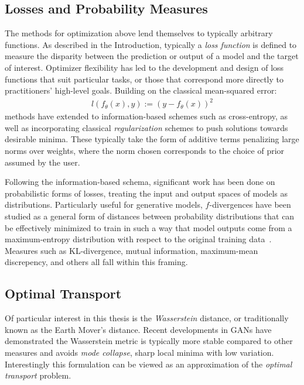 \subsection{Losses and Probability Measures}
The methods for optimization above
lend themselves to typically arbitrary functions.
As described in the Introduction,
typically a \textit{loss function}
is defined to measure the disparity
between the prediction or output of a model
and the target of interest.
Optimizer flexibility has led
to the development and design of loss functions
that suit particular tasks,
or those that correspond more directly
to practitioners' high-level goals.
Building on the classical mean-squared error:
\begin{align}
l(f_\theta(x), y) := (y - f_\theta(x))^2
\end{align}
methods have extended to information-based schemes
such as cross-entropy, as well as 
incorporating classical \textit{regularization} schemes
to push solutions towards desirable minima.
These typically take the form of additive terms 
penalizing large norms over weights, where
the norm chosen corresponds to the choice of 
prior assumed by the user.

Following the information-based schema,
significant work has been done
on probabilistic forms of losses,
treating the input and output spaces
of models as distributions.
Particularly useful for generative models,
$f$-divergences have been studied
as a general form of distances
between probability distributions
that can be effectively minimized to
train in such a way that model outputs
come from a maximum-entropy distribution
with respect to the original training data~\citep{fgan}.
Measures such as KL-divergence, mutual information,
maximum-mean discrepency, and others all fall within
this framing.

\subsection{Optimal Transport}	
Of particular interest in this thesis is the \textit{Wasserstein} distance,
or traditionally known as the Earth Mover's distance.
Recent developments in GANs \citep{wgan} have demonstrated
the Wasserstein metric is typically more stable
compared to other measures and avoids
\textit{mode collapse}, sharp local minima 
with low variation. Interestingly
this formulation can be viewed as an approximation
of the \textit{optimal transport} problem.

